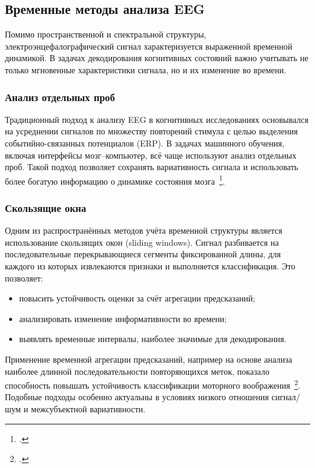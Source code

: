 \subsection{Временные методы анализа EEG}

Помимо пространственной и спектральной структуры, электроэнцефалографический сигнал характеризуется выраженной временной динамикой. В задачах декодирования когнитивных состояний важно учитывать не только мгновенные характеристики сигнала, но и их изменение во времени.

\subsubsection*{Анализ отдельных проб}

Традиционный подход к анализу EEG в когнитивных исследованиях основывался на усреднении сигналов по множеству повторений стимула с целью выделения событийно-связанных потенциалов (ERP). В задачах машинного обучения, включая интерфейсы мозг–компьютер, всё чаще используют анализ отдельных проб. Такой подход позволяет сохранять вариативность сигнала и использовать более богатую информацию о динамике состояния мозга~\footcite{10.1016/j.jneumeth.2003.10.009}.

\subsubsection*{Скользящие окна}

Одним из распространённых методов учёта временной структуры является использование скользящих окон (sliding windows). Сигнал разбивается на последовательные перекрывающиеся сегменты фиксированной длины, для каждого из которых извлекаются признаки и выполняется классификация. Это позволяет:

\begin{itemize}
\item повысить устойчивость оценки за счёт агрегации предсказаний;
\item анализировать изменение информативности во времени;
\item выявлять временные интервалы, наиболее значимые для декодирования.
\end{itemize}

Применение временной агрегации предсказаний, например на основе анализа наиболее длинной последовательности повторяющихся меток, показало способность повышать устойчивость классификации моторного воображения~\footcite{10.1109/jsen.2023.3270281}. Подобные подходы особенно актуальны в условиях низкого отношения сигнал/шум и межсубъектной вариативности.

